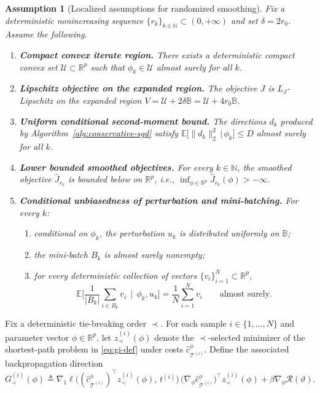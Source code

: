 \documentclass[11pt, letterpaper, oneside, reqno]{amsart}
\newcommand{\R}{\mathbb{R}}
\newcommand{\Let}{\triangleq}
\newtheorem{assumption}{Assumption}
\begin{document}
\begin{assumption}[Localized assumptions for randomized smoothing]
\label{ass:query-region}
Fix a deterministic nonincreasing sequence $\{r_k\}_{k\in\mathbb N}\subset(0,+\infty)$ and set $\delta = 2r_0$. Assume the following.
\begin{enumerate}[label=(\alph*),leftmargin=7mm]
\item \textbf{Compact convex iterate region.}
There exists a deterministic compact convex set $\mathcal U\subset\R^p$ such that $\phi_k\in \mathcal U$ almost surely for all $k$.

\item \textbf{Lipschitz objective on the expanded region.}
The objective $J$ is $L_J$-Lipschitz on the expanded region
$V = \mathcal U + 2\delta \mathbb B = \mathcal U + 4r_0\mathbb B$.

\item \textbf{Uniform conditional second-moment bound.}
The directions $d_k$ produced by Algorithm~\ref{alg:conservative-sgd} satisfy $\mathbb{E}\big[\|d_k\|_2^2 \,\big|\, \phi_k\big] \le D$ almost surely for all $k$.

\item \textbf{Lower bounded smoothed objectives.}
For every $k\in\mathbb N$, the smoothed objective $\hat J_{r_k}$ is bounded below on $\R^p$, i.e., 
$\inf_{\phi\in\R^p}\hat J_{r_k}(\phi)>-\infty$.

\item \textbf{Conditional unbiasedness of perturbation and mini-batching.}
For every $k$:
\begin{enumerate}[label=(\roman*),leftmargin=6mm]
\item conditional on $\phi_k$, the perturbation $u_k$ is distributed uniformly on $\mathbb B$;
\item the mini-batch $B_k$ is almost surely nonempty;
\item for every deterministic collection of vectors $\{v_i\}_{i=1}^N\subset\R^p$,
\[
\mathbb{E} \bigl[\frac1{|B_k|}\sum_{i\in B_k}v_i \,\mid\, \phi_k,u_k\bigr]
= \frac1N\sum_{i=1}^N v_i
\qquad\text{almost surely.}
\]
\end{enumerate}

\end{enumerate}
\end{assumption}



Fix a deterministic tie-breaking order $\prec$.
For each sample $i\in\{1,\dots,N\}$ and parameter vector $\phi\in\R^p$, let $z^{(i)}_{\prec}(\phi)$ denote the $\prec$-selected minimizer of the shortest-path problem in \eqref{eq:gi-def} under costs $\hat c_{\mathcal T^{(i)}}^\phi$. Define the associated backpropagation direction
\[
G^{(i)}_{\prec}(\phi)
\Let \nabla_1\ell\bigl((\hat c_{\mathcal T^{(i)}}^\phi)^\top z^{(i)}_{\prec}(\phi),\,t^{(i)}\bigr)\, \bigl(\nabla_\phi \hat c_{\mathcal T^{(i)}}^\phi\bigr)^\top z^{(i)}_{\prec}(\phi) +\beta \nabla_\phi \mathcal R(\vartheta).
\]
\end{document}
